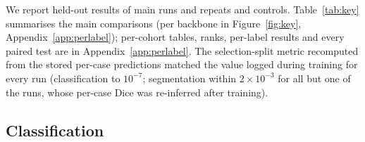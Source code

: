 \begin{table}[tb]
\centering
\caption{Label-level comparisons on the three main backbones: mean difference in held-out AUROC (classification) or Dice (segmentation), its 95\% interval over cohorts, labels and held-out cases, and the number of cohorts (datasets) with a positive mean difference. Each label counts once with its per-task and joint differences averaged, except in the two LoRA $-$ Dec sub-rows. LoRA $-$ Attn compares two methods with the same attentive head. Pooled estimates (``all'') use TAP-CT, SPECTRE and Pillar-0; VoCo is in Table~\ref{tab:keyvoco}. $^{\dagger}$ = did not train with the default setting (Section~\ref{sec:fullft}).}
\label{tab:key}
\end{table}

We report held-out results of \numRunsMainN{} main runs and \numRunsRevisionN{} repeats and controls. Table~\ref{tab:key} summarises the main comparisons (per backbone in Figure~\ref{fig:key}, Appendix~\ref{app:perlabel}); per-cohort tables, ranks, per-label results and every paired test are in Appendix~\ref{app:perlabel}. The selection-split metric recomputed from the stored per-case predictions matched the value logged during training for every run (classification to $10^{-7}$; segmentation within $2\times10^{-3}$ for all but one of the \numSelcheckSegRunsN{} runs, whose per-case Dice was re-inferred after training).

\subsection{Classification}
\label{sec:cls}

